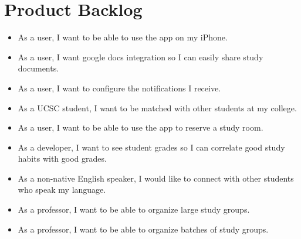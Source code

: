 \documentclass[10pt]{article}
\begin{document}
    \section{Product Backlog}
    \begin{itemize}
        \item As a user, I want to be able to use the app on my iPhone.
        \item As a user, I want google docs integration so I can easily share study documents.
        \item As a user, I want to configure the notifications I receive.
        \item As a UCSC student, I want to be matched with other students at my college.
        \item As a user, I want to be able to use the app to reserve a study room.
        \item As a developer, I want to see student grades so I can correlate good study habits with good grades.
        \item As a non-native English speaker, I would like to connect with other students who speak my language.
        \item As a professor, I want to be able to organize large study groups.
        \item As a professor, I want to be able to organize batches of study groups.
    \end{itemize}
    
    
\end{document}
